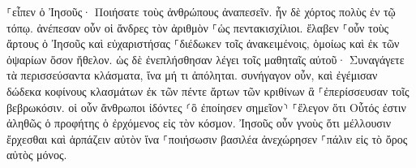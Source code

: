 \documentclass{openreader}
\begin{document}
⸀εἶπεν ὁ Ἰησοῦς· Ποιήσατε τοὺς ἀνθρώπους ἀναπεσεῖν. ἦν δὲ χόρτος πολὺς ἐν τῷ τόπῳ. ἀνέπεσαν οὖν οἱ ἄνδρες τὸν ἀριθμὸν ⸀ὡς πεντακισχίλιοι. 
ἔλαβεν ⸀οὖν τοὺς ἄρτους ὁ Ἰησοῦς καὶ εὐχαριστήσας ⸀διέδωκεν τοῖς ἀνακειμένοις, ὁμοίως καὶ ἐκ τῶν ὀψαρίων ὅσον ἤθελον. 
ὡς δὲ ἐνεπλήσθησαν λέγει τοῖς μαθηταῖς αὐτοῦ· Συναγάγετε τὰ περισσεύσαντα κλάσματα, ἵνα μή τι ἀπόληται. 
συνήγαγον οὖν, καὶ ἐγέμισαν δώδεκα κοφίνους κλασμάτων ἐκ τῶν πέντε ἄρτων τῶν κριθίνων ἃ ⸀ἐπερίσσευσαν τοῖς βεβρωκόσιν. 
οἱ οὖν ἄνθρωποι ἰδόντες ⸂ὃ ἐποίησεν σημεῖον⸃ ⸀ἔλεγον ὅτι Οὗτός ἐστιν ἀληθῶς ὁ προφήτης ὁ ἐρχόμενος εἰς τὸν κόσμον. 
Ἰησοῦς οὖν γνοὺς ὅτι μέλλουσιν ἔρχεσθαι καὶ ἁρπάζειν αὐτὸν ἵνα ⸀ποιήσωσιν βασιλέα ἀνεχώρησεν ⸀πάλιν εἰς τὸ ὄρος αὐτὸς μόνος. 
\end{document}
